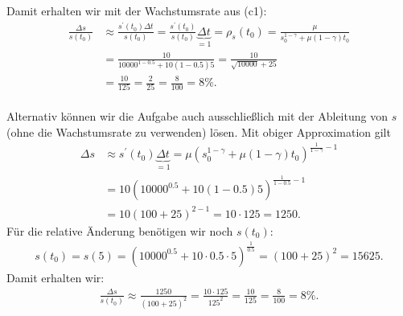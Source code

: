 Damit erhalten wir mit der Wachstumsrate aus (c1):
\begin{align*}
	\frac{\Delta s}{s(t_0)}
	&\approx 
	\frac{s^\prime(t_0 ) \Delta t}{s(t_0)}
	=
	\frac{s^\prime(t_0 ) }{s(t_0)}\underbrace{\Delta t}_{=1}
	=
	\rho_s(t_0) = 
	\frac{\mu}{s_0^{1- \gamma} + \mu (1- \gamma) t_0}\\
	&=
	\frac{10}{10000^{1 - 0.5} + 10 ( 1- 0.5)5 }
	=
	\frac{10}{\sqrt{10000} + 25 }\\
	&=
	\frac{10}{125}
	= 
	\frac{2}{25}
	= 
	\frac{8}{100} = 8 \%.
\end{align*}
\ \\
Alternativ können wir die Aufgabe auch ausschließlich mit der Ableitung von $s$ (ohne die Wachstumsrate zu verwenden) lösen. Mit obiger Approximation gilt
\begin{align*}
	\Delta s &\approx s^\prime(t_0) \underbrace{\Delta t}_{=1}
	=
	\mu \left(
		s_0^{1-\gamma} + \mu (1- \gamma) t_0
	\right)^{\frac{1}{1- \gamma} - 1}\\
	&=
	10 \left(
	10000^{0.5} + 10 (1- 0.5) 5
	\right)^{\frac{1}{1- 0.5} - 1}\\
	&=
	10 \left(
	100 + 25
	\right)^{2 - 1}
	=
	10 \cdot 125 
	=
	1250.
\end{align*}
Für die relative Änderung benötigen wir noch $s(t_0)$:
\begin{align*}
	s(t_0)
	= 
	s(5)
	= 
	(10000^{0.5} + 10 \cdot 0.5 \cdot 5)^{\frac{1}{0.5}} 
	= 
	(100 + 25)^2 
	=
	15625.
\end{align*}
Damit erhalten wir:
\begin{align*}
	\frac{\Delta s}{s(t_0)}
	\approx
	\frac{1250}{(100 + 25)^2 }
	=
	\frac{10 \cdot 125}{125^2}
	= \frac{10}{125} = \frac{8}{100} = 8 \%.
\end{align*}

